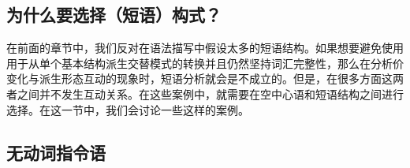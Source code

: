 \begin{exe}
\begin{xlist}[iv.]
\begin{exe}
\begin{xlist}[iv.]
\section{为什么要选择（短语）构式？}
\label{Abschnitt-Phrasale-Konstruktionen}\label{sec-why-phrasal}

在前面的章节中，我们反对在语法描写中假设太多的短语结构。如果想要避免使用用于从单个基本结构派生交替模式的转换并且仍然坚持词汇完整性，那么在分析价变化与派生形态互动的现象时，短语分析就会是不成立的。但是，在很多方面这两者之间并不发生互动关系。在这些案例中，就需要在空中心语和短语结构之间进行选择。在这一节中，我们会讨论一些这样的案例。

\subsection{无动词指令语}
\label{Abschnitt-Phrasale-Konstruktionen-Jacobs}


\end{xlist}
\end{exe}
\end{xlist}
\end{exe}
